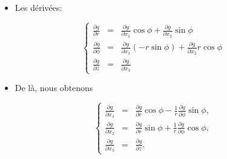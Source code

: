 \documentclass[french]{beamer}
\begin{document}
\begin{frame}

\begin{itemize}
  \item Les dérivées:
\end{itemize}

      \begin{equation}
	\left \{
	  \begin{array}{ccc}
\frac{\partial g}{\partial r} &=& \frac{\partial g}{\partial x_1}\cos\phi +  \frac{\partial g}{\partial x_2}\sin\phi \\
\frac{\partial g}{\partial \phi} &=& \frac{\partial g}{\partial x_1}(-r\sin\phi) +  \frac{\partial g}{\partial x_2}r\cos\phi\\
\frac{\partial g}{\partial z} &=& \frac{\partial g}{\partial x_3}
	  \end{array}
	  \right.
	\end{equation}
	
\pause 
\begin{itemize}
  \item De là, nous obtenons
\end{itemize}

	
      \begin{equation}
	\left \{
	  \begin{array}{ccc}

\frac{\partial g}{\partial x_1} &=& \frac{\partial g}{\partial r}\cos\phi - \frac{1}{r}\frac{\partial g}{\partial \phi}\sin\phi,\nonumber \\
\frac{\partial g}{\partial x_2} &=& \frac{\partial g}{\partial r}\sin\phi + \frac{1}{r}\frac{\partial g}{\partial \phi}\cos\phi, \\
\frac{\partial g}{\partial x_3} &=& \frac{\partial g}{\partial z}. \nonumber
	  \end{array}
	  \right.
	\end{equation}
\end{frame}	


\end{document}
